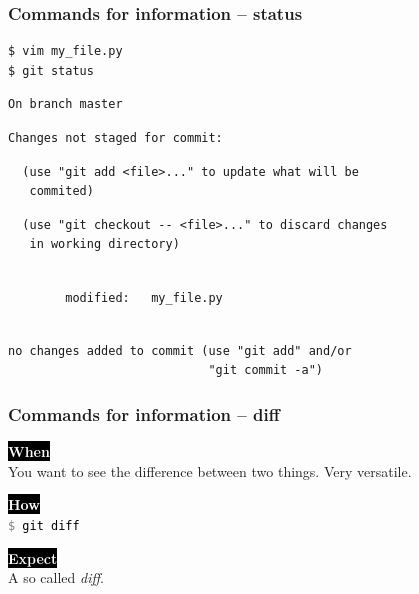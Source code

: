 \documentclass{beamer}
\newcommand{\keyword}[1]{\hspace{-1.0em}\colorbox{black}{\textcolor{white}{\textbf{#1}\vphantom{Ep}}}\vspace{0.2em}} %
\newcommand{\command}[1]{\colorbox{black!90!white!10!}{\vphantom{Ep}\texttt{\textcolor{gray}{\$} \textcolor{black}{#1}}}}
\begin{document}
\begin{frame}[fragile]
  \frametitle{Commands for information -- status}

\begin{verbatim}
$ vim my_file.py
$ git status
\end{verbatim}
\pause{}
\vspace{-3.5ex}
\begin{verbatim}
On branch master
\end{verbatim}
\pause{}
\vspace{-3.5ex}
\begin{verbatim}
Changes not staged for commit:
\end{verbatim}
\pause{}
\vspace{-3.5ex}
\begin{verbatim}
  (use "git add <file>..." to update what will be
   commited)
\end{verbatim}
\pause{}
\vspace{-3.5ex}
\begin{verbatim}
  (use "git checkout -- <file>..." to discard changes
   in working directory)
\end{verbatim}
\pause{}
\vspace{-3.5ex}
\begin{verbatim}

        modified:   my_file.py
\end{verbatim}
\pause{}
\vspace{-3.5ex}
\begin{verbatim}

no changes added to commit (use "git add" and/or
                            "git commit -a")
\end{verbatim}
\end{frame}

\begin{frame}
  \frametitle{Commands for information -- diff}

  \keyword{When}\\
  You want to see the difference between two things. Very versatile.
  \vspace{0.5em}

  \keyword{How}\\
  \command{git diff}
  \vspace{0.5em}

  \keyword{Expect}\\
  A so called \emph{diff}.
\end{frame}
\end{document}
